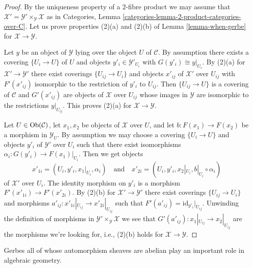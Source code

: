 \begin{proof}
By the uniqueness property of a $2$-fibre product we may assume that
$\mathcal{X}' = \mathcal{Y}' \times_\mathcal{Y} \mathcal{X}$
as in
Categories, Lemma \ref{categories-lemma-2-product-categories-over-C}.
Let us prove properties (2)(a) and (2)(b) of
Lemma \ref{lemma-when-gerbe}
for $\mathcal{X} \to \mathcal{Y}$.

\medskip\noindent
Let $y$ be an object of $\mathcal{Y}$ lying over the object $U$
of $\mathcal{C}$. By assumption there exists
a covering $\{U_i \to U\}$ of $U$ and objects
$y'_i \in \mathcal{Y}'_{U_i}$ with $G(y'_i) \cong y|_{U_i}$.
By (2)(a) for $\mathcal{X}' \to \mathcal{Y}'$ there exist
coverings $\{U_{ij} \to U_i\}$ and objects $x'_{ij}$ of
$\mathcal{X}'$ over $U_{ij}$ with $F'(x'_{ij})$ isomorphic
to the restriction of $y'_i$ to $U_{ij}$. Then
$\{U_{ij} \to U\}$ is a covering of $\mathcal{C}$ and
$G'(x'_{ij})$ are objects of $\mathcal{X}$ over $U_{ij}$
whose images in $\mathcal{Y}$ are isomorphic to the restrictions
$y|_{U_{ij}}$. This proves (2)(a) for $\mathcal{X} \to \mathcal{Y}$.

\medskip\noindent
Let $U \in \mathop{\mathrm{Ob}}\nolimits(\mathcal{C})$, let $x_1, x_2$ be objects of
$\mathcal{X}$ over $U$, and let $b : F(x_1) \to F(x_2)$ be a morphism
in $\mathcal{Y}_U$. By assumption we may choose a covering
$\{U_i \to U\}$ and objects $y'_i$ of $\mathcal{Y}'$
over $U_i$ such that there exist isomorphisms
$\alpha_i : G(y'_i) \to F(x_1)|_{U_i}$.
Then we get objects
$$
x'_{1i} = (U_i, y'_i, x_1|_{U_i}, \alpha_i)
\quad\text{and}\quad
x'_{2i} = (U_i, y'_i, x_2|_{U_i}, b|_{U_i} \circ \alpha_i)
$$
of $\mathcal{X}'$ over $U_i$. The identity morphism on $y'_i$ is a
morphism $F'(x'_{1i}) \to F'(x'_{2i})$. By (2)(b) for
$\mathcal{X}' \to \mathcal{Y}'$ there exist coverings
$\{U_{ij} \to U_i\}$ and morphisms
$a'_{ij} : x'_{1i}|_{U_{ij}} \to x'_{2i}|_{U_{ij}}$
such that $F'(a'_{ij}) = \text{id}_{y'_i}|_{U_{ij}}$. Unwinding the definition
of morphisms in $\mathcal{Y}' \times_\mathcal{Y} \mathcal{X}$
we see that $G'(a'_{ij}) : x_1|_{U_{ij}} \to x_2|_{U_{ij}}$ are
the morphisms we're looking for, i.e., (2)(b) holds for
$\mathcal{X} \to \mathcal{Y}$.
\end{proof}

\noindent
Gerbes all of whose automorphism sheaves are abelian play an important
role in algebraic geometry.

